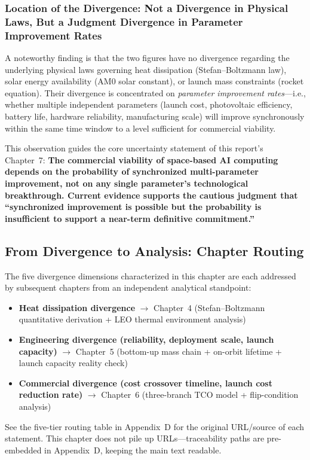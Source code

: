 \subsubsection{Location of the Divergence: Not a Divergence in Physical Laws, But a Judgment Divergence in Parameter Improvement Rates}

A noteworthy finding is that the two figures have no divergence regarding the underlying physical laws governing heat dissipation (Stefan--Boltzmann law), solar energy availability (AM0 solar constant), or launch mass constraints (rocket equation). Their divergence is concentrated on \emph{parameter improvement rates}---i.e., whether multiple independent parameters (launch cost, photovoltaic efficiency, battery life, hardware reliability, manufacturing scale) will improve synchronously within the same time window to a level sufficient for commercial viability.

This observation guides the core uncertainty statement of this report's Chapter~7: \textbf{The commercial viability of space-based AI computing depends on the probability of synchronized multi-parameter improvement, not on any single parameter's technological breakthrough. Current evidence supports the cautious judgment that ``synchronized improvement is possible but the probability is insufficient to support a near-term definitive commitment.''}

\subsection{From Divergence to Analysis: Chapter Routing}

The five divergence dimensions characterized in this chapter are each addressed by subsequent chapters from an independent analytical standpoint:

\begin{itemize}[leftmargin=*]
    \item \textbf{Heat dissipation divergence} $\to$ Chapter~4 (Stefan--Boltzmann quantitative derivation + LEO thermal environment analysis)
    \item \textbf{Engineering divergence (reliability, deployment scale, launch capacity)} $\to$ Chapter~5 (bottom-up mass chain + on-orbit lifetime + launch capacity reality check)
    \item \textbf{Commercial divergence (cost crossover timeline, launch cost reduction rate)} $\to$ Chapter~6 (three-branch TCO model + flip-condition analysis)
\end{itemize}

See the five-tier routing table in Appendix~D for the original URL/source of each statement. This chapter does not pile up URLs---traceability paths are pre-embedded in Appendix~D, keeping the main text readable.

\endinput
